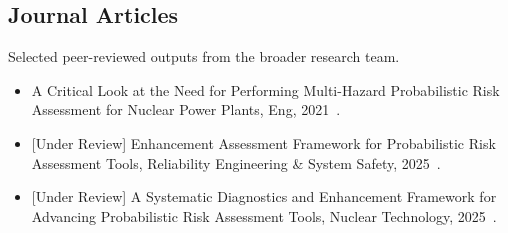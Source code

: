 \subsection{Journal Articles}
Selected peer-reviewed outputs from the broader research team.
\begin{itemize}
    \item {A Critical Look at the Need for Performing Multi-Hazard Probabilistic Risk Assessment for Nuclear Power Plants, Eng, 2021~\cite{aras_critical_2021}.}
    \item {[Under Review] Enhancement Assessment Framework for Probabilistic Risk Assessment Tools, Reliability Engineering \& System Safety, 2025~\cite{aras_nt_2025}.}
    \item {[Under Review] A Systematic Diagnostics and Enhancement Framework for Advancing Probabilistic Risk Assessment Tools, Nuclear Technology, 2025~\cite{aras_jress_2025}.}
\end{itemize}
